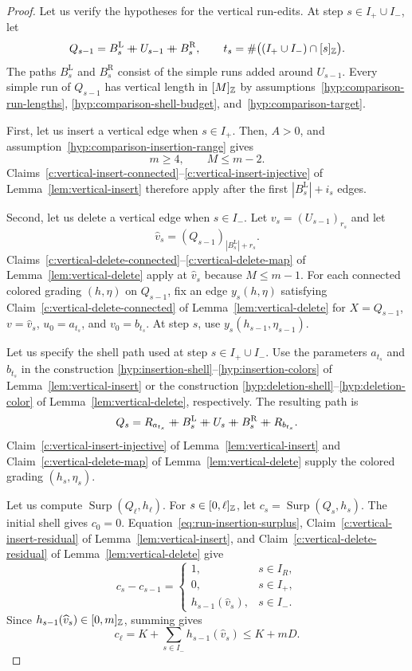 \begin{proof}
Let us verify the hypotheses for the vertical run-edits.
At step $s\in I_+\cup I_-$, let
\[
 Q_{s-1}=B_s^{\mathrm L}\mathbin{+\mkern-10mu+} U_{s-1}\mathbin{+\mkern-10mu+} B_s^{\mathrm R},\qquad
 t_s=\#\bigl((I_+\cup I_-)\cap[s]_{\mathbb Z}\bigr).
\]
The paths $B_s^{\mathrm L}$ and $B_s^{\mathrm R}$ consist of the simple runs added around $U_{s-1}$.
Every simple run of $Q_{s-1}$ has vertical length in $[M]_{\mathbb Z}$
by assumptions~\ref{hyp:comparison-run-lengths}, \ref{hyp:comparison-shell-budget}, and~\ref{hyp:comparison-target}.

First, let us insert a vertical edge when $s\in I_+$.
Then, $A>0$, and assumption~\ref{hyp:comparison-insertion-range} gives
\[
 m\ge4,\qquad M\le m-2.
\]
Claims~\ref{c:vertical-insert-connected}--\ref{c:vertical-insert-injective}
of Lemma~\ref{lem:vertical-insert} therefore apply after the first $|B_s^{\mathrm L}|+i_s$ edges.

Second, let us delete a vertical edge when $s\in I_-$.
Let $v_s=(U_{s-1})_{r_s}$ and let
\[
 \widehat v_s=(Q_{s-1})_{|B_s^{\mathrm L}|+r_s}.
\]
Claims~\ref{c:vertical-delete-connected}--\ref{c:vertical-delete-map}
of Lemma~\ref{lem:vertical-delete} apply at $\widehat v_s$ because $M\le m-1$.
For each connected colored grading $(h,\eta)$ on $Q_{s-1}$, fix an edge
$y_s(h,\eta)$ satisfying Claim~\ref{c:vertical-delete-connected} of Lemma~\ref{lem:vertical-delete}
for $X=Q_{s-1}$, $v=\widehat v_s$, $u_0=a_{t_s}$, and $v_0=b_{t_s}$.
At step $s$, use $y_s(h_{s-1},\eta_{s-1})$.

Let us specify the shell path used at step $s\in I_+\cup I_-$.
Use the parameters $a_{t_s}$ and $b_{t_s}$ in the construction
\ref{hyp:insertion-shell}--\ref{hyp:insertion-colors} of Lemma~\ref{lem:vertical-insert}
or the construction \ref{hyp:deletion-shell}--\ref{hyp:deletion-color} of Lemma~\ref{lem:vertical-delete}, respectively.
The resulting path is
\[
 Q_s=R_{a_{t_s}}\ccn B_s^{\mathrm L}\ccn U_s\ccn B_s^{\mathrm R}\ccn R_{b_{t_s}}.
\]
Claim~\ref{c:vertical-insert-injective} of Lemma~\ref{lem:vertical-insert}
and Claim~\ref{c:vertical-delete-map} of Lemma~\ref{lem:vertical-delete}
supply the colored grading $(h_s,\eta_s)$.

Let us compute $\operatorname{Surp}(Q_\ell,h_\ell)$.
For $s\in[0,\ell]_{\mathbb Z}$, let $c_s=\operatorname{Surp}(Q_s,h_s)$.
The initial shell gives $c_0=0$.
Equation~\eqref{eq:run-insertion-surplus}, Claim~\ref{c:vertical-insert-residual} of Lemma~\ref{lem:vertical-insert},
and Claim~\ref{c:vertical-delete-residual} of Lemma~\ref{lem:vertical-delete} give
\[
 c_s-c_{s-1}=
 \begin{cases}
 1,&s\in I_R,\\
 0,&s\in I_+,\\
 h_{s-1}(\widehat v_s),&s\in I_-.
 \end{cases}
\]
Since $h_{s-1}(\widehat v_s)\in[0,m]_{\mathbb Z}$, summing gives
\[
 c_\ell=K+\sum_{s\in I_-}h_{s-1}(\widehat v_s)\le K+mD.
\]


\end{proof}
